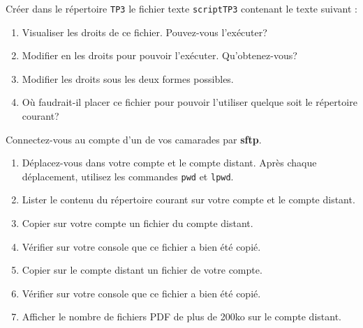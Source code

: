 \documentclass[a4paper,11pt]{exam}
\begin{document}
{
	  Créer dans le répertoire \texttt{TP3} le fichier texte \texttt{scriptTP3} contenant le texte suivant : 
	  \begin{enumerate}
	  \item Visualiser les droits de ce fichier. Pouvez-vous l’exécuter?
	  \item Modifier en les droits pour pouvoir l’exécuter. Qu'obtenez-vous?
	  \item Modifier les droits sous les deux formes possibles.
 	  \item Où faudrait-il placer ce fichier pour pouvoir l'utiliser quelque soit le répertoire courant?
  \reponse{}
	  \end{enumerate}
}
 
{
	    Connectez-vous au compte d'un de vos camarades par \textbf{sftp}.
	    \begin{enumerate}
	    \item Déplacez-vous dans votre compte et le compte distant. Après chaque déplacement, utilisez les commandes \texttt{pwd} et  \texttt{lpwd}.
	    \item Lister le contenu du répertoire courant sur votre compte et le compte distant.
	    \item Copier sur votre compte un fichier du compte distant.
	    \item Vérifier sur votre console que ce fichier a bien été copié.
	    \item Copier sur le compte distant un fichier de votre compte.
 	    \item Vérifier sur votre console que ce fichier a bien été copié.
            \item Afficher le nombre de fichiers PDF de plus de 200ko sur le compte distant. 
	    \end{enumerate}
}
\end{document}
